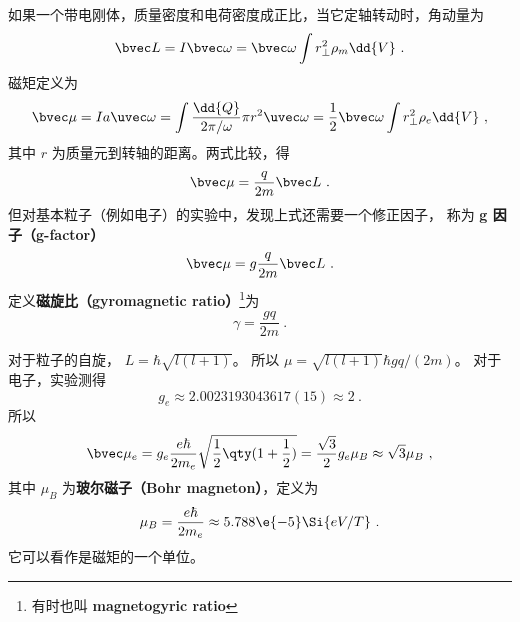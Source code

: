 


如果一个带电刚体，质量密度和电荷密度成正比，当它定轴转动时，角动量为
\begin{equation}
\bvec L = I\bvec \omega  = \bvec \omega \int r_\bot^2 \rho_m \dd{V}~.
\end{equation}
磁矩定义为
\begin{equation}
\bvec \mu  = Ia \uvec\omega = \int \frac{\dd{Q}}{2\pi/\omega}  \pi r^2 \uvec \omega
= \frac12 \bvec \omega \int r_\bot^2\rho_e \dd{V} ~,
\end{equation}
其中 $r$ 为质量元到转轴的距离。两式比较，得
\begin{equation}
\bvec \mu  = \frac{q}{2m} \bvec L~.
\end{equation}
但对基本粒子（例如电子）的实验中，发现上式还需要一个修正因子， 称为 \textbf{g 因子（g-factor）}
\begin{equation}
\bvec \mu  = g\frac{q}{2m}\bvec L~.
\end{equation}
定义\textbf{磁旋比（gyromagnetic ratio）}\footnote{有时也叫 \textbf{magnetogyric ratio}}为
\begin{equation}
\gamma  = \frac{gq}{2m}~.
\end{equation}

对于粒子的自旋， $L = \hbar \sqrt{l(l + 1)} $。 所以 $\mu = \sqrt{l (l + 1)} \hbar gq/(2m)$。 
对于电子，实验测得
\begin{equation}
g_e \approx 2.0023193043617(15) \approx 2~.
\end{equation}
所以
\begin{equation}
\bvec \mu_e  = g_e \frac{e\hbar}{2 m_e} \sqrt{\frac12 \qty(1 + \frac12)}  = \frac{\sqrt 3}{2} g_e \mu_B \approx \sqrt 3 \mu_B~,
\end{equation}
其中 $\mu_B$ 为\textbf{玻尔磁子（Bohr magneton）}，定义为
\begin{equation}
\mu_B = \frac{e\hbar}{2 m_e} \approx 5.788\e{-5} \Si{eV/T}~.
\end{equation}
它可以看作是磁矩的一个单位。
